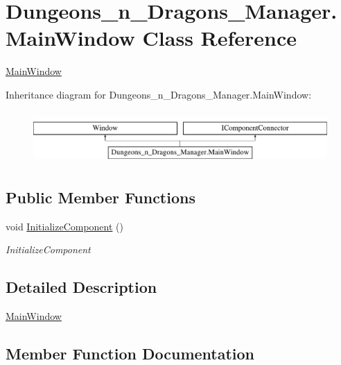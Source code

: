 \hypertarget{class_dungeons__n___dragons___manager_1_1_main_window}{}\section{Dungeons\+\_\+n\+\_\+\+Dragons\+\_\+\+Manager.\+Main\+Window Class Reference}
\label{class_dungeons__n___dragons___manager_1_1_main_window}


\mbox{\hyperlink{class_dungeons__n___dragons___manager_1_1_main_window}{Main\+Window}}  


Inheritance diagram for Dungeons\+\_\+n\+\_\+\+Dragons\+\_\+\+Manager.\+Main\+Window\+:\begin{figure}[H]
\begin{center}
\leavevmode
\includegraphics[height=2.000000cm]{class_dungeons__n___dragons___manager_1_1_main_window}
\end{center}
\end{figure}
\subsection*{Public Member Functions}
\begin{DoxyCompactItemize}
\item 
void \mbox{\hyperlink{class_dungeons__n___dragons___manager_1_1_main_window_adfd3b38f73f024d804fd3b1b2877d589}{Initialize\+Component}} ()
\begin{DoxyCompactList}\small\item\em Initialize\+Component \end{DoxyCompactList}\end{DoxyCompactItemize}


\subsection{Detailed Description}
\mbox{\hyperlink{class_dungeons__n___dragons___manager_1_1_main_window}{Main\+Window}} 



\subsection{Member Function Documentation}
\mbox{\label{class_dungeons__n___dragons___manager_1_1_main_window_adfd3b38f73f024d804fd3b1b2877d589}} 
